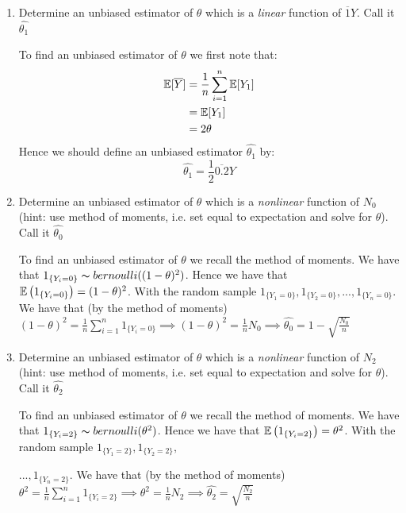 \documentclass[12pt, a4paper]{article}
\begin{document}
\begin{enumerate}[label={\bfseries\arabic*.}]
\item Determine an unbiased estimator of $\theta$ which is a \textit{linear} function of $\overbar{1}{Y}$. Call it $\hat{\theta_1}$

{\setlength{\leftskip}{3ex}

To find an unbiased estimator of $\theta$ we first note that:
\begin{align*}
\E[\overbar{0.5}{Y}] & = \frac{1}{n}\sum_{i = 1}^n\E[Y_1]\\
& = \E[Y_1] \\
& = 2\theta
\end{align*}
Hence we should define an unbiased estimator $\hat{\theta_1}$ by: 
$$\hat{\theta_1} = \frac{1}{2}\overbar{0.2}{Y}$$
}
\item Determine an unbiased estimator of $\theta$ which is a \textit{nonlinear} function of $N_0$ (hint: use method of moments, i.e. set equal to expectation and solve for $\theta$). Call it $\hat{\theta_0}$

{\setlength{\leftskip}{3ex}

To find an unbiased estimator of $\theta$ we recall the method of moments. We have that $1_{\{Y_i = 0\}} \thicksim bernoulli((1 - \theta)^2)$. Hence we have that $\operatorname{\mathbb{E}}\left(1_{\{Y_i = 0\}}\right) = (1 - \theta)^2$. With the random sample $1_{\{Y_1 = 0\}}, 1_{\{Y_2 = 0\}}, ..., 1_{\{Y_n = 0\}}$. We have that (by the method of moments) $ (1 - \theta)^2 = \frac{1}{n}\sum_{i = 1}^n 1_{\{Y_i = 0\}} \implies (1 - \theta)^2 = \frac{1}{n}N_0 \implies \hat{\theta_0} = 1 - \sqrt{\frac{N_0}{n}}$

}

\item Determine an unbiased estimator of $\theta$ which is a \textit{nonlinear} function of $N_2$ (hint: use method of moments, i.e. set equal to expectation and solve for $\theta$). Call it $\hat{\theta_2}$

{\setlength{\leftskip}{3ex}

To find an unbiased estimator of $\theta$ we recall the method of moments. We have that $1_{\{Y_i = 2\}} \thicksim bernoulli(\theta^2)$. Hence we have that $\operatorname{\mathbb{E}}\left(1_{\{Y_i = 2\}}\right) =\theta^2$. With the random sample $1_{\{Y_1 = 2\}}, 1_{\{Y_2 = 2\}},$ 

$..., 1_{\{Y_n = 2\}}$. We have that (by the method of moments) $ \theta^2 = \frac{1}{n}\sum_{i = 1}^n 1_{\{Y_i = 2\}} \implies \theta^2 = \frac{1}{n}N_2 \implies \hat{\theta_2} = \sqrt{\frac{N_2}{n}}$

}
\end{enumerate}
\end{document}
